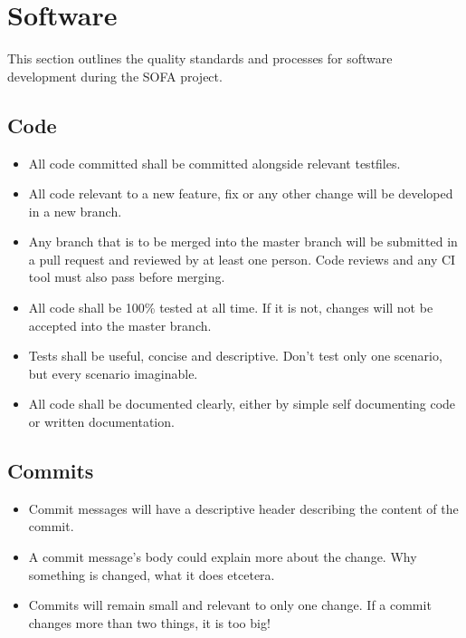 \section{Software}
This section outlines the quality standards and processes for software development during the SOFA project.

\subsection{Code}
\begin{itemize}
	\item All code committed shall be committed alongside relevant testfiles.
	\item All code relevant to a new feature, fix or any other change will be developed in a new branch.
	\item Any branch that is to be merged into the master branch will be submitted in a pull request and reviewed by at least one person.
	Code reviews and any CI tool must also pass before merging.
	\item All code shall be 100\% tested at all time. If it is not, changes will not be accepted into the master branch.
	\item Tests shall be useful, concise and descriptive. Don't test only one scenario, but every scenario imaginable.
	\item All code shall be documented clearly, either by simple self documenting code or written documentation.
\end{itemize}

\subsection{Commits}

\begin{itemize}
	\item Commit messages will have a descriptive header describing the content of the commit.
	\item A commit message's body could explain more about the change. Why something is changed, what it does etcetera.
	\item Commits will remain small and relevant to only one change. If a commit changes more than two things, it is too big!
\end{itemize}